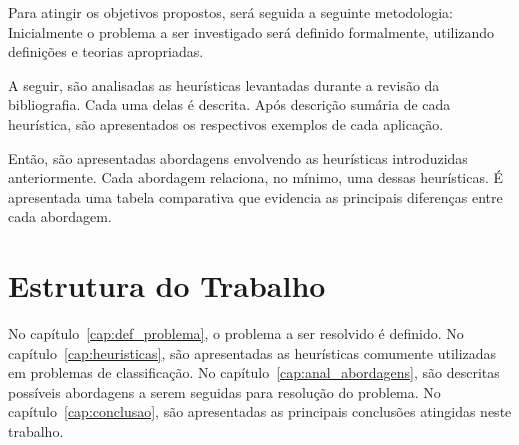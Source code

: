 Para atingir os objetivos propostos, será seguida a seguinte metodologia:
Inicialmente o problema a ser investigado será definido formalmente,
utilizando definições e teorias apropriadas.


A seguir, são analisadas as heurísticas levantadas durante a
revisão da bibliografia. Cada uma delas é descrita. Após descrição sumária
de cada heurística, são apresentados os respectivos exemplos de cada aplicação.

Então, são apresentadas abordagens envolvendo as heurísticas introduzidas
anteriormente. Cada abordagem relaciona, no mínimo, uma dessas heurísticas.
É apresentada uma tabela comparativa que evidencia as principais diferenças
entre cada abordagem.


\section{Estrutura do Trabalho}

No capítulo~\ref{cap:def_problema}, o problema a ser resolvido é definido.
No capítulo~\ref{cap:heuristicas}, são apresentadas as
heurísticas comumente utilizadas em problemas de classificação.
No capítulo~\ref{cap:anal_abordagens}, são descritas possíveis abordagens a serem
seguidas para resolução do problema.
No capítulo~\ref{cap:conclusao}, são apresentadas as principais conclusões
atingidas neste trabalho.
